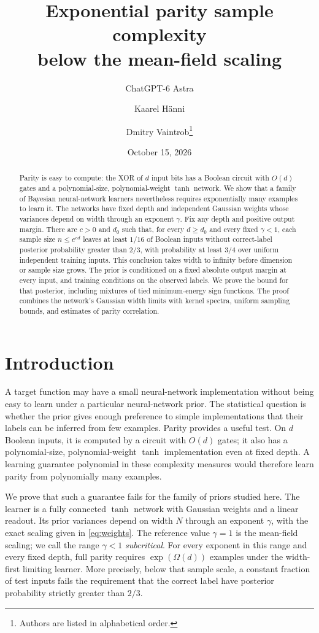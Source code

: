 \documentclass[11pt]{article}
\title{Exponential parity sample complexity\\below the mean-field scaling}
\author{ChatGPT-6 Astra \and Kaarel H\"anni \and Dmitry Vaintrob\thanks{Authors are listed in alphabetical order.}}
\date{October 15, 2026}
\theoremstyle{remark}\newtheorem{remark}[theorem]{Remark}
\begin{document}
\maketitle
\begin{abstract}
Parity is easy to compute: the XOR of $d$ input bits has a Boolean circuit
with $O(d)$ gates and a polynomial-size, polynomial-weight $\tanh$ network.
We show that a family of Bayesian neural-network learners nevertheless
requires exponentially many examples to learn it. The networks have fixed
depth and independent Gaussian weights whose variances depend on width
through an exponent $\gamma$. Fix any depth and positive output margin.
There are $c>0$ and $d_0$ such that, for every
$d\ge d_0$ and every fixed $\gamma<1$, each sample size $n\le e^{cd}$ leaves at least $1/16$ of Boolean inputs without
correct-label posterior probability greater than $2/3$, with probability
at least $3/4$ over uniform independent training inputs. This conclusion
takes width to infinity before dimension or sample size grows. The prior
is conditioned on a fixed absolute output margin at every input, and
training conditions on the observed labels. We prove the bound for that
posterior, including mixtures of tied minimum-energy sign functions.
The proof combines the network's Gaussian width limits with kernel
spectra, uniform sampling bounds, and estimates of parity correlation.
\end{abstract}

\section*{Introduction}
A target function may have a small neural-network implementation without
being easy to learn under a particular neural-network prior. The
statistical question is whether the prior gives enough preference to
simple implementations that their labels can be inferred from few
examples. Parity provides a useful test. On $d$ Boolean inputs, it is
computed by a circuit with $O(d)$ gates; it also has a polynomial-size,
polynomial-weight $\tanh$ implementation even at fixed depth. A learning
guarantee polynomial in these complexity measures would therefore learn
parity from polynomially many examples.

We prove that such a guarantee fails for the family of priors studied
here. The learner is a fully connected $\tanh$ network with Gaussian
weights and a linear readout. Its prior variances depend on width $N$
through an exponent $\gamma$, with the exact scaling given in
\eqref{eq:weights}. The reference value $\gamma=1$ is the mean-field
scaling; we call the range $\gamma<1$ \emph{subcritical}.
For every exponent in this range and every fixed depth, full parity
requires $\exp(\Omega(d))$ examples under the width-first limiting
learner. More precisely, below that sample scale, a constant fraction
of test inputs fails the requirement that the correct label have
posterior probability strictly greater than $2/3$.
\end{document}
